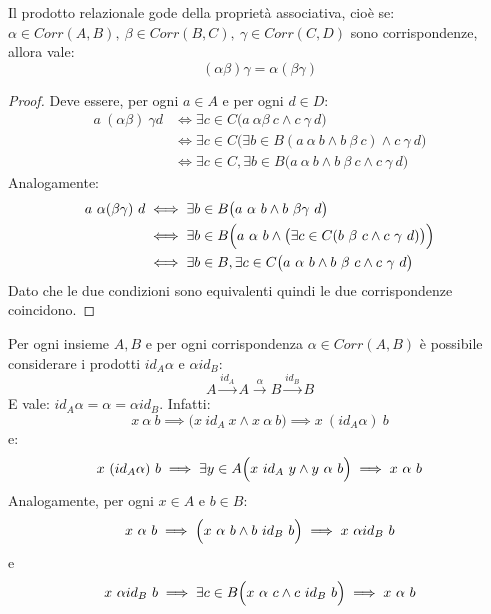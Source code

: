 \begin{teorbox}
	Il prodotto relazionale gode della proprietà associativa, cioè se:
	$\alpha \in Corr(A, B), \ \beta \in Corr(B,C), \ \gamma \in Corr(C,D)$	sono corrispondenze, allora vale:
	\begin{equation}
		(\alpha \beta) \gamma = \alpha(\beta \gamma)
	\end{equation}
\end{teorbox}

\begin{proof}
	Deve essere, per ogni $a \in A$ e per ogni $d \in D$:
	\begin{align*}
		a \ (\alpha \beta) \ \gamma d & \iff \exists c \in C \bigl( a \ \alpha \beta \ c \wedge c \ \gamma \ d \bigr)  \\
		& \iff \exists c \in C \bigl( \exists b \in B (a \ \alpha \ b \wedge b \ \beta \ c) \wedge c \ \gamma \ d \bigr) \\
		& \iff \exists c \in C, \exists b \in B \bigl(a \ \alpha \ b \wedge b \ \beta \ c \wedge c \ \gamma \ d\bigr)
	\end{align*}
	Analogamente:
	\begin{align*}
		a \ \alpha (\beta \gamma) \ d & \iff \exists b \in B \bigl(a \ \alpha \ b \wedge b \ \beta\gamma \ d \bigr)\\
		& \iff \exists b \in B \Bigl( a \ \alpha \ b \wedge \bigl(\exists c \in C (b \ \beta \ c \wedge c \ \gamma \ d) \bigr) \Bigr) \\
		& \iff \exists b \in B, \exists c \in C \bigl( a \ \alpha \ b \wedge b \ \beta \ c \wedge c \ \gamma \ d \bigr)
	\end{align*}
	Dato che le due condizioni sono equivalenti quindi le due corrispondenze coincidono.
\end{proof}

Per ogni insieme $A,B$ e per ogni corrispondenza $\alpha \in Corr(A,B)$ è possibile considerare i prodotti $id_{A}\alpha$ e $\alpha id_{B}$: $$A \stackrel{id_{A}}{\longrightarrow} A \stackrel{\alpha}{\longrightarrow} B \stackrel{id_{B}}{\longrightarrow} B$$E vale: $id_{A}\alpha = \alpha = \alpha id_{B}$. Infatti:
\begin{displaymath}
	x \ \alpha \ b  \implies \bigl( x \ id_{A} \ x \wedge x \ \alpha \ b \bigr) \implies x \ (id_{A} \alpha) \ b
\end{displaymath}
e:
\begin{displaymath}
	x \ (id_{A} \alpha) \ b \implies  \exists y \in A \Bigl( x \ id_{A} \ y \wedge y \ \alpha \ b \Bigr) \implies x \ \alpha \ b
\end{displaymath}
Analogamente, per ogni $x \in A$ e $b \in B$:
\begin{displaymath}
	x \ \alpha \ b \implies \Bigl( x \ \alpha \ b \wedge b \ id_{B} \ b\Bigr) \implies x \ \alpha id_{B} \ b
\end{displaymath}
e
\begin{displaymath}
	x \ \alpha id_{B} \ b \implies \exists c \in B \Bigl( x \ \alpha \ c \wedge c \ id_{B} \ b \Bigr) \implies x \ \alpha \ b
\end{displaymath}

